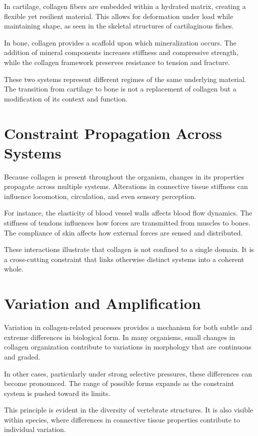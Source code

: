 \documentclass[11pt,oneside]{book}
\begin{document}
In cartilage, collagen fibers are embedded within a hydrated matrix, creating a flexible yet resilient material. This allows for deformation under load while maintaining shape, as seen in the skeletal structures of cartilaginous fishes.

In bone, collagen provides a scaffold upon which mineralization occurs. The addition of mineral components increases stiffness and compressive strength, while the collagen framework preserves resistance to tension and fracture.

These two systems represent different regimes of the same underlying material. The transition from cartilage to bone is not a replacement of collagen but a modification of its context and function.

\section{Constraint Propagation Across Systems}

Because collagen is present throughout the organism, changes in its properties propagate across multiple systems. Alterations in connective tissue stiffness can influence locomotion, circulation, and even sensory perception.

For instance, the elasticity of blood vessel walls affects blood flow dynamics. The stiffness of tendons influences how forces are transmitted from muscles to bones. The compliance of skin affects how external forces are sensed and distributed.

These interactions illustrate that collagen is not confined to a single domain. It is a cross-cutting constraint that links otherwise distinct systems into a coherent whole.

\section{Variation and Amplification}

Variation in collagen-related processes provides a mechanism for both subtle and extreme differences in biological form. In many organisms, small changes in collagen organization contribute to variations in morphology that are continuous and graded.

In other cases, particularly under strong selective pressures, these differences can become pronounced. The range of possible forms expands as the constraint system is pushed toward its limits.

This principle is evident in the diversity of vertebrate structures. It is also visible within species, where differences in connective tissue properties contribute to individual variation.
\end{document}
